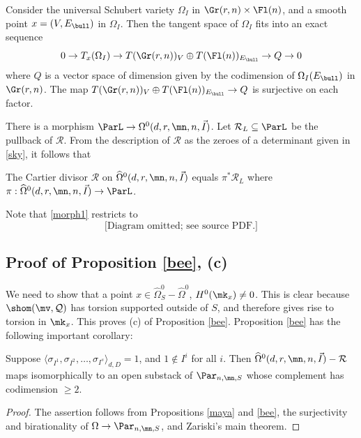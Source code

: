 \begin{remark}
\notready\label{afternoon}
Consider the universal Schubert variety $\Omega_I$ in $\Gr(r,n)\times\Fl(n)$, and a smooth point $x=(V,E_{\bull})$ in $\Omega_I$. Then the tangent space of $\Omega_I$ fits into an exact sequence
$$0\to T_x(\Omega_I) \to T(\Gr(r,n))_V\oplus T(\Fl(n))_{E_{\bull}}\to Q\to 0$$ where $Q$ is a vector space of dimension given by the codimension of $\Omega_I(E_{\bull})$ in $\Gr(r,n)$. The map $T(\Gr(r,n))_V\oplus T(\Fl(n))_{E_{\bull}}\to Q$ is surjective on each factor.
\end{remark}
There is a morphism  $\ParL\to {\Omega}^0(d,r,\mn,n,\vec{I})$. Let $\mathcal{R}_L\subseteq \ParL$ be the pullback of $\mathcal{R}$. From the description of $\mathcal{R}$ as the zeroes of a determinant given in \eqref{sky}, it follows that
\begin{lemma}
\notready
The Cartier divisor $\mathcal{R}$ on  $\widehat{\Omega}^0(d,r,\mn,n,\vec{I})$ equals $\pi^*\mathcal{R}_L$ where
$\pi: \widehat{\Omega}^0(d,r,\mn,n,\vec{I})\to \ParL$.
\end{lemma}

Note that \eqref{morph1} restricts to
 \begin{equation}
\text{[Diagram omitted; see source PDF.]}
\end{equation}
\subsection{Proof of Proposition \ref{bee}, (c)}\label{martel}
We need to show that a point $x\in\widehat{\Omega}_{S}^0-\widehat{\Omega}^0$, $H^0(\mk_x)\neq 0$. This is clear because $\shom(\mv,\mathcal{Q})$ has torsion supported outside of $S$, and therefore gives rise to torsion in $\mk_x$.
This proves (c) of Proposition \ref{bee}. Proposition \ref{bee} has the following important corollary:
\begin{corollary}
\notready\label{carole}
Suppose $\langle\sigma_{I^1}, \sigma_{I^2},\dots,\sigma_{I^s}\rangle_{d,D}=1$, and $1\not\in I^i$ for all $i$. Then $\widehat{\Omega}^0(d,r,\mn,n,\vec{I})-\mathcal{R}$ maps isomorphically to an open substack of $\Par_{n,\mn,S}$ whose complement has codimension $\geq 2$.
\end{corollary}
\begin{proof}
 The assertion follows from Propositions \ref{maya} and \ref{bee}, the surjectivity and birationality of $\Omega\to \Par_{n,\mn,S}$, and Zariski's main theorem.
\end{proof}
